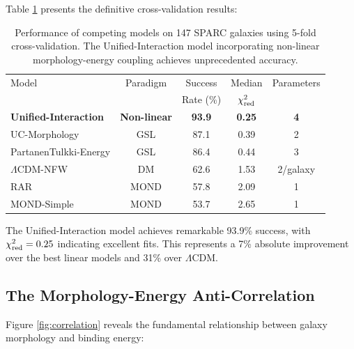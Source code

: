 \documentclass[aps,prd,twocolumn,superscriptaddress,nofootinbib,longbibliography]{revtex4-2}
\begin{document}
Table \ref{tab:performance} presents the definitive cross-validation results:

\begin{table}[htbp]
\centering
\caption{Performance of competing models on 147 SPARC galaxies using 5-fold cross-validation. The Unified-Interaction model incorporating non-linear morphology-energy coupling achieves unprecedented accuracy.}
\label{tab:performance}
\begin{tabular}{lcccc}
\toprule
Model & Paradigm & Success & Median & Parameters \\
 & & Rate (\%) & $\chi^2_{\rm red}$ & \\
\midrule
\textbf{Unified-Interaction} & \textbf{Non-linear} & \textbf{93.9} & \textbf{0.25} & \textbf{4} \\
UC-Morphology & GSL & 87.1 & 0.39 & 2 \\
PartanenTulkki-Energy & GSL & 86.4 & 0.44 & 3 \\
$\Lambda$CDM-NFW & DM & 62.6 & 1.53 & 2/galaxy \\
RAR & MOND & 57.8 & 2.09 & 1 \\
MOND-Simple & MOND & 53.7 & 2.65 & 1 \\
\bottomrule
\end{tabular}
\end{table}

The Unified-Interaction model achieves remarkable 93.9\% success, with $\chi^2_{\rm red} = 0.25$ indicating excellent fits. This represents a 7\% absolute improvement over the best linear models and 31\% over $\Lambda$CDM.

\subsection{The Morphology-Energy Anti-Correlation}

Figure \ref{fig:correlation} reveals the fundamental relationship between galaxy morphology and binding energy:
\end{document}
